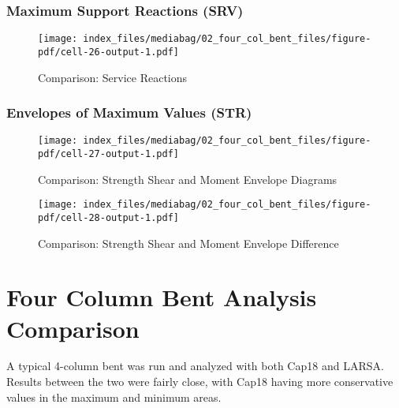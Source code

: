 \documentclass[
  letterpaper,
  DIV=11,
  numbers=noendperiod]{scrreprt}
\begin{document}
\subsection{Maximum Support Reactions
(SRV)}\label{maximum-support-reactions-srv-2}

\begin{figure}[H]

{\centering \texttt{[image: index\_files/mediabag/02\_four\_col\_bent\_files/figure-pdf/cell-26-output-1.pdf]}

}

\caption{Comparison: Service Reactions}

\end{figure}%

\subsection{Envelopes of Maximum Values
(STR)}\label{envelopes-of-maximum-values-str-2}

\begin{figure}[H]

{\centering \texttt{[image: index\_files/mediabag/02\_four\_col\_bent\_files/figure-pdf/cell-27-output-1.pdf]}

}

\caption{Comparison: Strength Shear and Moment Envelope Diagrams}

\end{figure}%

\begin{figure}[H]

{\centering \texttt{[image: index\_files/mediabag/02\_four\_col\_bent\_files/figure-pdf/cell-28-output-1.pdf]}

}

\caption{Comparison: Strength Shear and Moment Envelope Difference}

\end{figure}%


\chapter{Four Column Bent Analysis
Comparison}\label{four-column-bent-analysis-comparison-1}

A typical 4-column bent was run and analyzed with both Cap18 and LARSA.
Results between the two were fairly close, with Cap18 having more
conservative values in the maximum and minimum areas.
\end{document}

